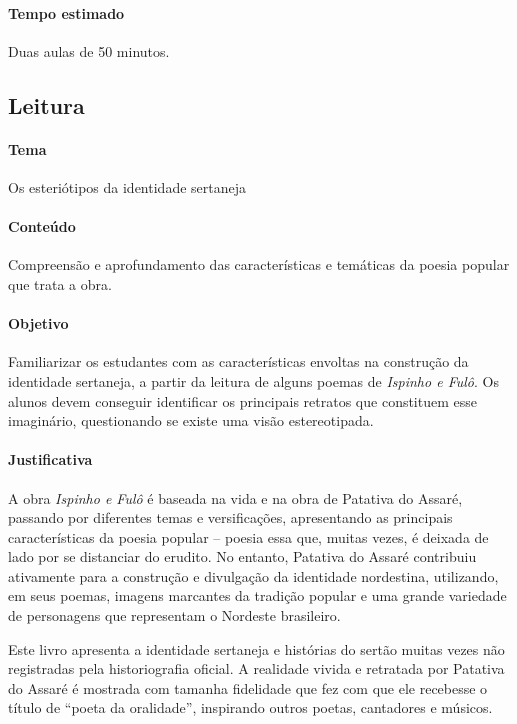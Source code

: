 \documentclass[12pt]{extarticle}
\begin{document}
\paragraph{Tempo estimado} Duas aulas de 50 minutos. 


\subsection{Leitura}

\paragraph{Tema} Os esteriótipos da identidade sertaneja 


\paragraph{Conteúdo} Compreensão e aprofundamento das características e 
temáticas da poesia popular que trata a obra.

\paragraph{Objetivo} Familiarizar os estudantes com as características 
envoltas na construção da identidade sertaneja, a partir da leitura de 
alguns poemas de \emph{Ispinho e Fulô}.
Os alunos devem conseguir identificar os principais retratos que 
constituem esse imaginário, questionando se existe uma visão estereotipada. 


\paragraph{Justificativa} A obra \emph{Ispinho e Fulô} é baseada na vida 
e na obra de Patativa do Assaré, passando por diferentes temas e 
versificações, apresentando as principais características da poesia 
popular -- poesia essa que, muitas vezes, é deixada de lado por se 
distanciar do erudito.
No entanto, Patativa do Assaré contribuiu ativamente para a construção e
divulgação da identidade nordestina, utilizando, em seus poemas, imagens
marcantes da tradição popular e uma grande variedade de personagens que
representam o Nordeste brasileiro.

Este livro apresenta a identidade sertaneja e histórias do sertão muitas
vezes não registradas pela historiografia oficial. A realidade vivida e
retratada por Patativa do Assaré é mostrada com tamanha fidelidade que
fez com que ele recebesse o título de ``poeta da oralidade'', inspirando
outros poetas, cantadores e músicos.
\end{document}
